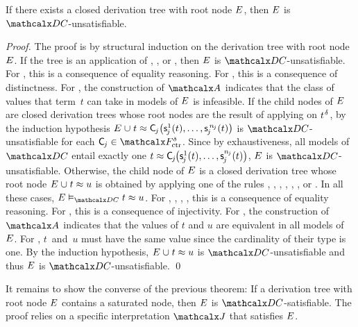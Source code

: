\begin{theorem}%
\label{thm:rs}%
\afterDot
If there exists a closed derivation tree with root node\/ $E$, then\/ $E$ is $\thD$-unsatisfiable.
\end{theorem}
\begin{proof}
The proof is by structural induction on the derivation tree with root node $E$.
If the tree is an application of , , or ,
then $E$ is $\thD$-unsatisfiable.
For , this is a consequence of equality reasoning.
For , this is a consequence of distinctness.
For , the construction of $\Val$ indicates that the class of values that term~$t$ can take in models of $E$ is infeasible.
If the child nodes of $E$ are closed derivation trees
whose root nodes are the result of applying  on $t\typ{\delta}$,
by the induction hypothesis $E \mathrel\cup t \approx \smash{\textsf{C}_{\kern-0.083333em j}\bigl( \textsf{s}^1_{\kern-0.083333em j}( t ), \ldots, \textsf{s}^{\,\smash{n_{\kern-0.083333em j}}}_{\kern-0.083333em j}( t ) \bigr)}$ is
$\thD$-unsatisfiable
for each $\const C_{\negvthinspace j} \in \smash{\Ctr^\delta}$.
Since by exhaustiveness, all models of $\thD$ entail exactly one
$t \approx \textsf{C}_{\kern-0.083333em j}\kern-0.083333em\bigl(\textsf{s}^1_{\kern-0.083333em j}( t ), \ldots,\textsf{s}^{n_{\kern-0.083333em j}}_{\kern-0.083333em j}( t )\bigr)$,
$E$ is $\thD$-unsatisfiable.
Otherwise, the child node of $E$ is a closed derivation tree
whose root
node $E \mathrel\cup t \approx u$ is obtained by applying one of the rules , , , , , , or .
In all these cases, $\Ec \models_{\thD} t \teq u$.
For , , , , this is a consequence of equality reasoning.
For , this is a consequence of injectivity.
For , the construction of $\Val$ indicates that the values of $t$ and $u$ are equivalent in all models of $E$.
For , $t$~and~$u$ must have the same value since the cardinality of their type is one.
By the induction hypothesis, $E \mathrel\cup t \approx u$ is $\thD$-unsatisfiable
and thus $E$ is $\thD$-unsatisfiable.
\qed
\end{proof}

It remains to show the converse of the previous theorem: If a derivation tree
with root node $E$ contains a saturated node, then $E$ is
$\thD$-satisfiable.
The proof relies on a specific interpretation $\J$ that satisfies $E$.

